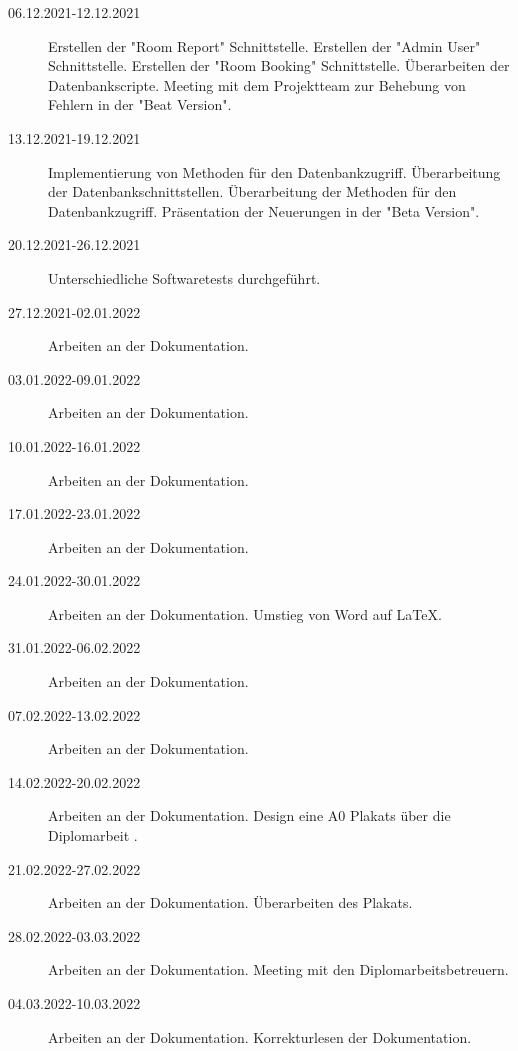 \begin{description}
    \item[06.12.2021-12.12.2021] Erstellen der "Room Report" Schnittstelle. Erstellen der "Admin User" Schnittstelle. Erstellen der "Room Booking" Schnittstelle. Überarbeiten der Datenbankscripte. Meeting mit dem Projektteam zur Behebung von Fehlern in der "Beat Version". 
    \item[13.12.2021-19.12.2021] Implementierung von Methoden für den Datenbankzugriff. Überarbeitung der Datenbankschnittstellen. Überarbeitung der Methoden für den Datenbankzugriff. Präsentation der Neuerungen in der "Beta Version". 
    \item[20.12.2021-26.12.2021] Unterschiedliche Softwaretests durchgeführt. 
    \item[27.12.2021-02.01.2022] Arbeiten an der Dokumentation.
    \item[03.01.2022-09.01.2022] Arbeiten an der Dokumentation.
    \item[10.01.2022-16.01.2022] Arbeiten an der Dokumentation.
    \item[17.01.2022-23.01.2022] Arbeiten an der Dokumentation.
    \item[24.01.2022-30.01.2022] Arbeiten an der Dokumentation. Umstieg von Word auf \mbox{LaTeX}.
    \item[31.01.2022-06.02.2022] Arbeiten an der Dokumentation.
    \item[07.02.2022-13.02.2022] Arbeiten an der Dokumentation.
    \item[14.02.2022-20.02.2022] Arbeiten an der Dokumentation. Design eine A0 Plakats über die Diplomarbeit \ZELIA.
    \item[21.02.2022-27.02.2022] Arbeiten an der Dokumentation. Überarbeiten des Plakats.
    \item[28.02.2022-03.03.2022] Arbeiten an der Dokumentation. Meeting mit den Diplomarbeitsbetreuern.
    \item[04.03.2022-10.03.2022] Arbeiten an der Dokumentation. Korrekturlesen der Dokumentation.  
\end{description}